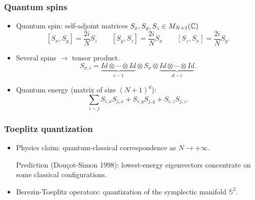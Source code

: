 \documentclass[mathserif]{beamer}
\begin{document}
    \begin{frame}\frametitle{Quantum spins}
	\begin{itemize}
		\item Quantum spin: self-adjoint matrices
                  $S_x,S_y,S_z\in M_{N+1}(\mathbb{C})$ \[[S_x,S_y]=\frac{2i}{N}S_z\qquad
                    [S_y,S_z]=\frac{2i}{N}S_x\qquad [S_z,S_x]=\frac{2i}{N}S_y.\]
                \item Several spins $\rightarrow$ {\color{myorange} tensor product}.
                    \[S_{x,i}=\underbrace{Id\otimes \cdots\otimes Id}_{i-1}\otimes S_x\otimes
                                                                              \underbrace{Id\otimes
                                                                                \cdots
                                                                              \otimes
                                                                              Id}_{d-i}.\]
                                                                          
                                                                        \item<2>
                                                                          Quantum
                                                                          energy
                                                                          (matrix
                                                                          of
                                                                          size
                                                                          $(N+1)^d$):
                                                                          \[
                                                                            \sum_{i\sim j}S_{i,x}S_{j,x}+S_{i,y}S_{j,y}+S_{i,z}S_{j,z}.\]
                    
      
      \end{itemize}
    \end{frame}
    \begin{frame}
      \frametitle{Toeplitz quantization}
      \begin{itemize}
        \item Physics claim: {\color{myorange} quantum-classical
          correspondence} as $N\to +\infty$.
        
      Prediction (Douçot-Simon 1998): lowest-energy eigenvectors concentrate on
      {\color{myorange} some} classical configurations.

    \item<2> Berezin-Toeplitz operators: quantization of the
      symplectic manifold $\mathbb{S}^2$.
    \end{itemize}
  \end{frame}
\end{document}

